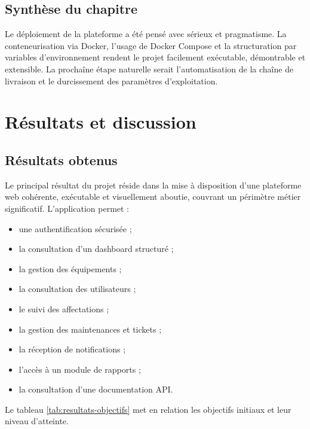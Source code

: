 ﻿\documentclass[12pt,a4paper,oneside]{report}
\begin{document}
\section{Synthèse du chapitre}
Le déploiement de la plateforme a été pensé avec sérieux et pragmatisme. La conteneurisation via Docker, l'usage de Docker Compose et la structuration par variables d'environnement rendent le projet facilement exécutable, démontrable et extensible. La prochaîne étape naturelle serait l'automatisation de la chaîne de livraison et le durcissement des paramètres d'exploitation.










\chapter{Résultats et discussion}
\label{chap:results}

\section{Résultats obtenus}
Le principal résultat du projet réside dans la mise à disposition d'une plateforme web cohérente, exécutable et visuellement aboutie, couvrant un périmètre métier significatif. L'application permet :
\begin{itemize}
  \item une authentification sécurisée ;
  \item la consultation d'un dashboard structuré ;
  \item la gestion des équipements ;
  \item la consultation des utilisateurs ;
  \item le suivi des affectations ;
  \item la gestion des maintenances et tickets ;
  \item la réception de notifications ;
  \item l'accès à un module de rapports ;
  \item la consultation d'une documentation API.
\end{itemize}

Le tableau \ref{tab:resultats-objectifs} met en relation les objectifs initiaux et leur niveau d'atteinte.
\end{document}
